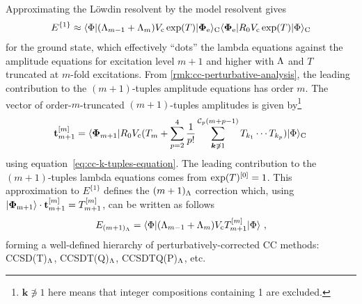 \documentclass[11pt]{article}
\numberwithin{equation}{section}
\begin{document}
\begin{ex}
Approximating the L\"owdin resolvent by the model resolvent gives
\begin{align}
  E^{\{1\}}
\approx
  \langle\Phi |(\Lambda _{m-1} + \Lambda _m)V_{\mathrm{c}}\,\mathrm{exp}(T)|\mathbf{\Phi }_{\mathrm{e}}\rangle_{\mathrm{C}}
  \langle\mathbf{\Phi }_{\mathrm{e}}|R_0 V_{\mathrm{c}}\,\mathrm{exp}(T)|\Phi \rangle_{\mathrm{C}}
\end{align}
for the ground state, which effectively ``dots'' the lambda equations against the amplitude equations for excitation level $m+1$ and higher with $\Lambda $ and $T$ truncated at $m$-fold excitations.
From \cref{rmk:cc-perturbative-analysis}, the leading contribution to the $(m+1)$-tuples amplitude equations  has order $m$.
The vector of order-$m$-truncated $(m+1)$-tuples amplitudes is given by\footnote{$\bm{k}\not\ni 1$ here means that integer compositions containing 1 are excluded.}
\begin{align}
  \bo{t}_{m+1}\bord{m}
=
  \br{\bo{\F}_{m+1}}R_0
    V_\mr{c}
    (
      T_m
    +
      \sum_{p=2}^4
      \fr{1}{p!}
      \sum_{\bm{k}\not\ni 1}^{\mc{C}_p(m+p-1)}
      T_{k_1}
      \cd
      T_{k_p}
    )
  \kt{\F}_\mr{C}\,
\end{align}
using equation~\ref{eq:cc-k-tuples-equation}.
The leading contribution to the $(m+1)$-tuples lambda equations comes from $\mathrm{exp}(T)^{[0]}= 1$.
This approximation to $E^{\{1\}}$ defines the
$
  (m+1)_{\Lambda }
$
correction
which,
using
$
  |\mathbf{\Phi }_{\mathrm{m+1}}\rangle\cdot
  \mathbf{t}_{m+1}^{[m]}
=
  T_{m+1}^{[m]}
$, can be written as follows
\begin{align}
  E_{(m+1)_{\Lambda }}
=
  \langle\Phi |(\Lambda _{m-1} + \Lambda _m) V_{\mathrm{c}} T_{m+1}^{[m]}|\Phi \rangle\,\,,
\end{align}
forming a well-defined hierarchy of perturbatively-corrected CC methods:
CCSD(T)$_{\Lambda }$,
CCSDT(Q)$_{\Lambda }$,
CCSDTQ(P)$_{\Lambda }$,
etc.
\end{ex}
\end{document}
